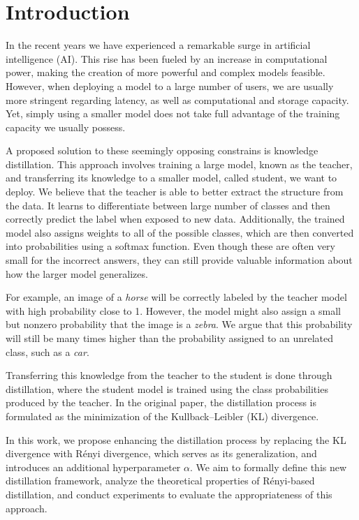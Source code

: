 \chapter*{Introduction}

In the recent years we have experienced a remarkable surge in artificial intelligence (AI). This rise has been fueled by an increase in computational power, making the creation of more powerful and complex models feasible. However, when deploying a model to a large number of users, we are usually more stringent regarding latency, as well as computational and storage capacity. Yet, simply using a smaller model does not take full advantage of the training capacity we usually possess.

A proposed solution to these seemingly opposing constrains is knowledge distillation. This approach involves training a large model, known as the teacher, and transferring its knowledge to a smaller model, called student, we want to deploy. We believe that the teacher is able to better extract the structure from the data. It learns to differentiate between large number of classes and then correctly predict the label when exposed to new data. Additionally, the trained model also assigns weights to all of the possible classes, which are then converted into probabilities using a softmax function. Even though these are often very small for the incorrect answers, they can still provide valuable information about how the larger model generalizes.

For example, an image of a \textit{horse} will be correctly labeled by the teacher model with high probability close to 1. However, the model might also assign a small but nonzero probability that the image is a \textit{zebra}. We argue that this probability will still be many times higher than the probability assigned to an unrelated class, such as a \textit{car}.

Transferring this knowledge from the teacher to the student is done through distillation, where the student model is trained using the class probabilities produced by the teacher. In the original paper, the distillation process is formulated as the minimization of the Kullback–Leibler (KL) divergence.

In this work, we propose enhancing the distillation process by replacing the KL divergence with Rényi divergence, which serves as its generalization, and introduces an additional hyperparameter $\alpha$. We aim to formally define this new distillation framework, analyze the theoretical properties of Rényi-based distillation, and conduct experiments to evaluate the appropriateness of this approach.

